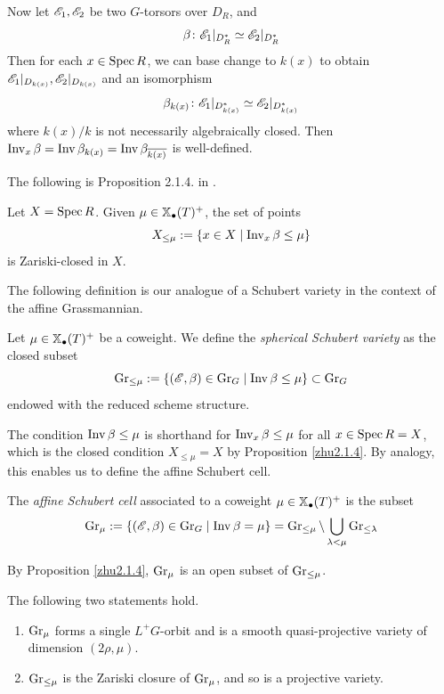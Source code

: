 \documentclass[12pt]{article}
\begin{document}
Now let $\mathscr{E}_1,\mathscr{E}_2$ be two $G$-torsors over $D_R$, and 
\[\beta \colon \mathscr{E}_1\vert_{D_R^*} \simeq \mathscr{E}_2 \vert_{D_R^*}\]
Then for each $x \in \operatorname{Spec} R$, we can base change to $k(x)$ to obtain $\mathscr{E}_1\vert_{D_{k(x)}}, \mathscr{E}_2\vert_{D_{k(x)}}$ and an isomorphism
\[\beta_{k(x)} \colon \mathscr{E}_1\vert_{D_{k(x)}^*} \simeq \mathscr{E}_2 \vert_{D_{k(x)}^*}\]
where $k(x)/k$ is not necessarily algebraically closed. Then $\operatorname{Inv}_x \beta = \operatorname{Inv} \beta_{k(x)} = \operatorname{Inv} \beta_{\overline{k(x)}}$ is well-defined.

The following is Proposition 2.1.4. in \cite{Zhu2016}.
\begin{prop}\label{zhu2.1.4}
    Let $X = \operatorname{Spec} R$. Given $\mu \in \mathbb{X}_{\bullet}(T)^+$, the set of points
    \[X_{\leq \mu} := \{x \in X \mid \operatorname{Inv}_x \beta \leq \mu\}\]
    is Zariski-closed in $X$.
\end{prop}
The following definition is our analogue of a Schubert variety in the context of the affine Grassmannian.
\begin{defn}
    Let $\mu \in \mathbb{X}_{\bullet}(T)^+$ be a coweight. We define the \textit{spherical Schubert variety} as the closed subset
    \[\operatorname{Gr}_{\leq \mu} := \{(\mathscr{E}, \beta) \in \operatorname{Gr}_G \mid \operatorname{Inv} \beta \leq \mu\} \subset \operatorname{Gr}_G\]
    endowed with the reduced scheme structure. 
\end{defn}
The condition $\operatorname{Inv} \beta \leq \mu$ is shorthand for $\operatorname{Inv}_x \beta \leq \mu$ for all $x \in \operatorname{Spec} R = X$, which is the closed condition $X_{\leq \mu} = X$ by Proposition \ref{zhu2.1.4}. By analogy, this enables us to define the affine Schubert cell.
\begin{defn}
    The \textit{affine Schubert cell} associated to a coweight $\mu \in \mathbb{X}_{\bullet}(T)^+$ is the subset
    \[\operatorname{Gr}_{\mu} := \{(\mathscr{E}, \beta) \in \operatorname{Gr}_G \mid \operatorname{Inv} \beta  = \mu\} = \operatorname{Gr}_{\leq \mu} \setminus \bigcup_{\lambda < \mu} \operatorname{Gr}_{\leq \lambda}\]
\end{defn}
By Proposition \ref{zhu2.1.4}, $\operatorname{Gr}_{\mu}$ is an open subset of $\operatorname{Gr}_{\leq \mu}$.
\begin{prop} The following two statements hold.
    \begin{enumerate}
        \item $\operatorname{Gr}_{\mu}$ forms a single $L^+G$-orbit and is a smooth quasi-projective variety of dimension $(2\rho, \mu)$.
        \item $\operatorname{Gr}_{\leq \mu}$ is the Zariski closure of $\operatorname{Gr}_{\mu}$, and so is a projective variety.
    \end{enumerate}
\end{prop}
\end{document}
